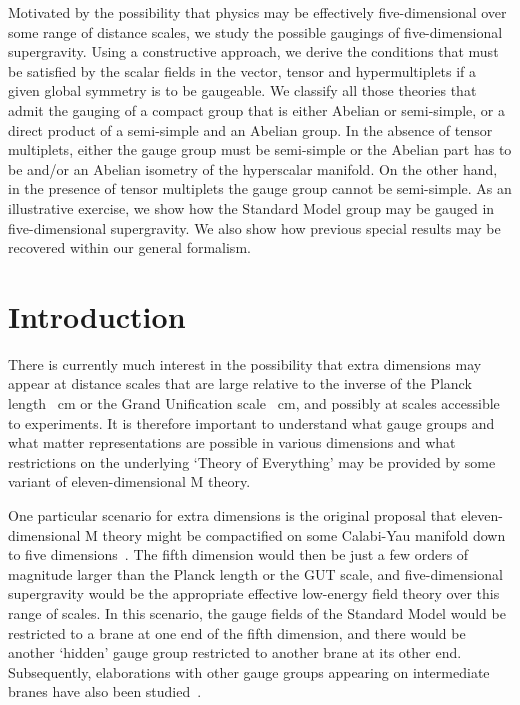 \documentclass[a4paper,11pt]{article}
\renewcommand{\theequation}{\thesection.\arabic{equation}}
\begin{document}
\begin{titlepage}
\begin{small}
Motivated by the possibility that physics may be effectively
five-dimensional over some range of distance scales, we study the possible
gaugings of five-dimensional \coordHE{} supergravity.  Using a
constructive approach, we derive the conditions that must be satisfied by
the scalar fields in the vector, tensor and hypermultiplets if a given
global symmetry is to be gaugeable. We classify all those theories that
admit the gauging of a compact group that is either Abelian or
semi-simple, or a direct product of a semi-simple and an Abelian group. In
the absence of tensor multiplets, either the gauge group must be
semi-simple or the Abelian part has to be \coordHE{} and/or an Abelian
isometry of the hyperscalar manifold. On the other hand, in the presence
of tensor multiplets the gauge group cannot be semi-simple. As an
illustrative exercise, we show how the Standard Model \coordHE{} group may be gauged in five-dimensional \coordHE{}
supergravity. We also show how previous special results may be recovered
within our general formalism. 

\end{small}




\end{titlepage}

\renewcommand{\theequation}{\arabic{section}.\arabic{equation}}
\section{Introduction}
\setcounter{equation}{0}

There is currently much interest in the possibility that extra dimensions may appear at 
distance scales that are large relative to the inverse of the Planck length \coordHE{}~cm or the Grand Unification scale \coordHE{}~cm, and possibly 
at scales accessible to experiments. It is therefore important to understand what gauge 
groups and what matter representations are possible in various dimensions and  what 
restrictions on the underlying `Theory of Everything' may be provided by some variant of 
eleven-dimensional M theory.

One particular scenario for extra dimensions is the original proposal that
eleven-dimensional M theory might be compactified on some Calabi-Yau
manifold down to five dimensions~\cite{HW}. The fifth dimension would then
be just a few orders of magnitude larger than the Planck length or the GUT
scale, and five-dimensional supergravity would be the appropriate
effective low-energy field theory over this range of scales. In this
scenario, the \coordHE{} gauge fields of the
Standard Model would be restricted to a brane at one end of the fifth
dimension, and there would be another `hidden' gauge group restricted to
another brane at its other end. Subsequently, elaborations with other
gauge groups appearing on intermediate branes have also been
studied~\cite{Ovrut}. 
\end{document}
